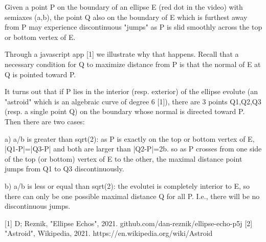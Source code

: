 Given a point P on the boundary of an ellipse E (red dot in the video) with semiaxes (a,b), the point Q also on the boundary of E which is furthest away from P may experience discontinuous "jumps" as P is slid smoothly across the top or bottom vertex of E.

Through a javascript app [1] we illustrate why that happens. Recall that a necessary condition for Q to maximize distance from P is that the normal of E at Q is pointed toward P.

It turns out that if P lies in the interior (resp. exterior) of the ellipse evolute (an "astroid" which is an algebraic curve of degree 6 [1]), there are 3 points Q1,Q2,Q3 (resp. a single point Q) on the boundary whose normal is directed toward P. Then there are two cases:

a) a/b is greater than sqrt(2): as P is exactly on the top or bottom vertex of E,   |Q1-P|=|Q3-P| and both are larger than |Q2-P|=2b. so as P crosses from one side of the top (or bottom) vertex of E to the other, the maximal distance point jumps from Q1 to Q3 discontinuously.

b) a/b is less or equal than sqrt(2): the evolutei is completely interior to E, so there can only be one possible maximal distance Q for all P. I.e., there will be no discontinuous jumps.

[1] D; Reznik, "Ellipse Echos", 2021. github.com/dan-reznik/ellipse-echo-p5j
[2] "Astroid", Wikipedia, 2021. https://en.wikipedia.org/wiki/Astroid